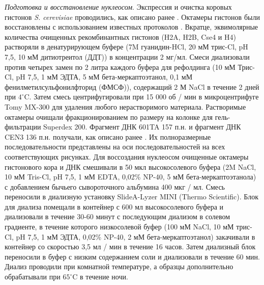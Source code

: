 \emph{Подготовка и восстановление нуклеосом}. Экспрессия и очистка коровых гистонов \textit{S. cerevisiae} проводились, как описано ранее \cite{xiao_nonhistone_2011,dyer_reconstitution_2004,mizuguchi_nonhistone_2007}. Октамеры гистонов были восстановлены с использованием известных протоколов \cite{dyer_reconstitution_2004}. Вкратце, эквимолярные количества очищенных рекомбинантных гистонов (H2A, H2B, Cse4 и H4) растворяли в денатурирующем буфере (7M гуанидин-HCl, 20 мМ трис-Cl, pH 7,5, 10 мМ дитиотреитол (ДДТ)) в концентрации 2 мг/мл. Смеси диализовали против четырех замен по 2 литра каждого буфера для рефолдинга (10 мМ Трис-Cl, pH 7,5, 1 мМ ЭДТА, 5 мМ бета-меркаптоэтанол, 0,1 мМ фенилметилсульфонилфторид (ФМСФ)), содержащий 2 М NaCl в течение 2 дней при $4^{\circ}$C. Затем смесь центрифугировали при 15 000 об / мин в микроцентрифуге Tomy MX-300 для удаления любого нерастворимого материала. Растворимые октамеры очищали фракционированием по размеру на колонке для гель-фильтрации Superdex 200. Фрагмент ДНК 601TA 157 п.н. \cite{cloutier_dna_2005} и фрагмент ДНК CEN3 136 п.н. получали, как описано ранее \cite{xiao_nonhistone_2011}. Их полноразмерные последовательности представлены на оси последовательностей на всех соответствующих рисунках. Для воссоздания нуклеосом очищенные октамеры гистонового кора и ДНК смешивали в 50 мкл высокосолевого буфера (2M NaCl, 10 мМ Tris-Cl, pH 7,5, 1 мМ EDTA, 0,02\% NP-40, 5 мМ бета-меркаптоэтанола) с добавлением бычьего сывороточного альбумина 400 мкг / мл. Смесь переносили в диализную установку SlideA-Lyzer MINI (Thermo Scientific). Блок для диализа помещали в контейнер с 600 мл высокосолевого буфера и диализовали в течение 30-60 минут с последующим диализом в солевом градиенте, в течение которого низкосолевой буфер (100 мМ NaCl, 10 мМ трис-Cl, pH 7,5, 1 мМ ЭДТА, 0,02\% NP-40, 2 мМ бета-меркаптоэтанол) закачивали в контейнер со скоростью 3,5 мл / мин в течение 16 часов. Затем диализный блок переносили в буфер с низким содержанием соли и диализовали в течение 60 мин. Диализ проводили при комнатной температуре, а образцы дополнительно обрабатывали при $65^{\circ}$C в течение ночи. 

